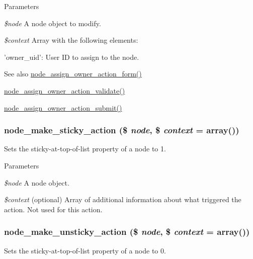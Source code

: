 \begin{DoxyParams}{Parameters}
\item[{\em \$node}]A node object to modify. \item[{\em \$context}]Array with the following elements:
\begin{DoxyItemize}
\item 'owner\_\-uid': User ID to assign to the node.
\end{DoxyItemize}\end{DoxyParams}
\begin{DoxySeeAlso}{See also}
\hyperlink{group__forms_ga427eee96a0ab2c2048a39fafcb6c4173}{node\_\-assign\_\-owner\_\-action\_\-form()} 

\hyperlink{node_8module_a85a0ccfdb35dae02fed98ec3c3498c85}{node\_\-assign\_\-owner\_\-action\_\-validate()} 

\hyperlink{node_8module_a777bb331cf28f580e2a3030d95d9f254}{node\_\-assign\_\-owner\_\-action\_\-submit()} 
\end{DoxySeeAlso}
\hypertarget{group__actions_ga73254d8abc7dfa53cd2259230bd5246a}{
\subsubsection[{node\_\-make\_\-sticky\_\-action}]{\setlength{\rightskip}{0pt plus 5cm}node\_\-make\_\-sticky\_\-action (\$ {\em node}, \/  \$ {\em context} = {\ttfamily array()})}}
\label{group__actions_ga73254d8abc7dfa53cd2259230bd5246a}
Sets the sticky-\/at-\/top-\/of-\/list property of a node to 1.


\begin{DoxyParams}{Parameters}
\item[{\em \$node}]A node object. \item[{\em \$context}](optional) Array of additional information about what triggered the action. Not used for this action. \end{DoxyParams}
\hypertarget{group__actions_gab04ec5d42febda8ef49715c27c4ad126}{
\subsubsection[{node\_\-make\_\-unsticky\_\-action}]{\setlength{\rightskip}{0pt plus 5cm}node\_\-make\_\-unsticky\_\-action (\$ {\em node}, \/  \$ {\em context} = {\ttfamily array()})}}
\label{group__actions_gab04ec5d42febda8ef49715c27c4ad126}
Sets the sticky-\/at-\/top-\/of-\/list property of a node to 0.


